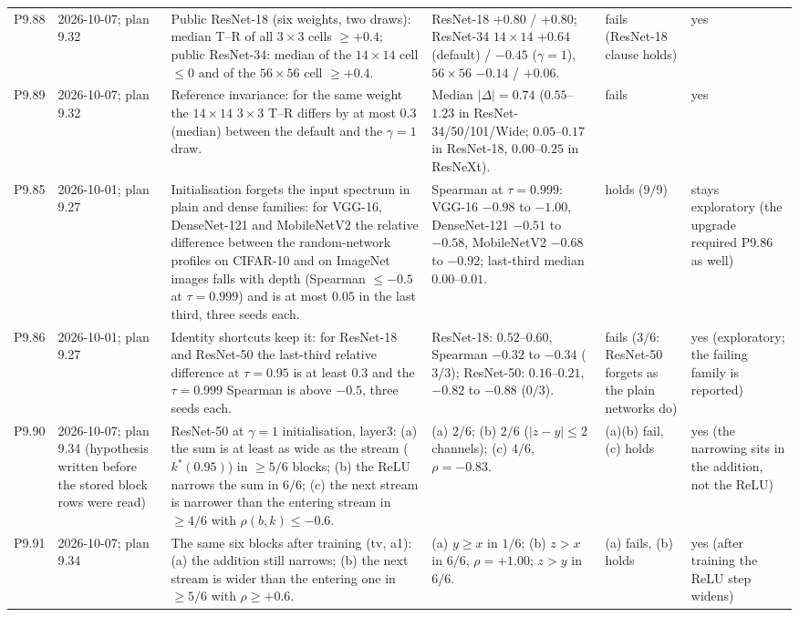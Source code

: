 \begin{longtable}{p{1.1cm}p{1.4cm}p{6.2cm}p{4.6cm}p{2.0cm}p{1.6cm}}
P9.88 & 2026-10-07; plan 9.32 & Public ResNet-18 (six weights, two draws): median T--R of all $3\times3$ cells $\ge +0.4$; public ResNet-34: median of the $14\times14$ cell $\le 0$ and of the $56\times56$ cell $\ge +0.4$. & ResNet-18 $+0.80$ / $+0.80$; ResNet-34 $14\times14$ $+0.64$ (default) / $-0.45$ ($\gamma = 1$), $56\times56$ $-0.14$ / $+0.06$. & fails (ResNet-18 clause holds) & yes \\
P9.89 & 2026-10-07; plan 9.32 & Reference invariance: for the same weight the $14\times14$ $3\times3$ T--R differs by at most $0.3$ (median) between the default and the $\gamma = 1$ draw. & Median $|\Delta| = 0.74$ ($0.55$--$1.23$ in ResNet-34/50/101/Wide; $0.05$--$0.17$ in ResNet-18, $0.00$--$0.25$ in ResNeXt). & fails & yes \\
P9.85 & 2026-10-01; plan 9.27 & Initialisation forgets the input spectrum in plain and dense families: for VGG-16, DenseNet-121 and MobileNetV2 the relative difference between the random-network profiles on CIFAR-10 and on ImageNet images falls with depth (Spearman $\le -0.5$ at $\tau = 0.999$) and is at most $0.05$ in the last third, three seeds each. & Spearman at $\tau = 0.999$: VGG-16 $-0.98$ to $-1.00$, DenseNet-121 $-0.51$ to $-0.58$, MobileNetV2 $-0.68$ to $-0.92$; last-third median $0.00$--$0.01$. & holds ($9/9$) & stays exploratory (the upgrade required P9.86 as well) \\
P9.86 & 2026-10-01; plan 9.27 & Identity shortcuts keep it: for ResNet-18 and ResNet-50 the last-third relative difference at $\tau = 0.95$ is at least $0.3$ and the $\tau = 0.999$ Spearman is above $-0.5$, three seeds each. & ResNet-18: $0.52$--$0.60$, Spearman $-0.32$ to $-0.34$ ($3/3$); ResNet-50: $0.16$--$0.21$, $-0.82$ to $-0.88$ ($0/3$). & fails ($3/6$: ResNet-50 forgets as the plain networks do) & yes (exploratory; the failing family is reported) \\
P9.90 & 2026-10-07; plan 9.34 (hypothesis written before the stored block rows were read) & ResNet-50 at $\gamma = 1$ initialisation, layer3: (a) the sum is at least as wide as the stream ($k^*(0.95)$) in $\ge 5/6$ blocks; (b) the ReLU narrows the sum in $6/6$; (c) the next stream is narrower than the entering stream in $\ge 4/6$ with $\rho(b, k) \le -0.6$. & (a) $2/6$; (b) $2/6$ ($|z - y| \le 2$ channels); (c) $4/6$, $\rho = -0.83$. & (a)(b) fail, (c) holds & yes (the narrowing sits in the addition, not the ReLU) \\
P9.91 & 2026-10-07; plan 9.34 & The same six blocks after training (tv, a1): (a) the addition still narrows; (b) the next stream is wider than the entering one in $\ge 5/6$ with $\rho \ge +0.6$. & (a) $y \ge x$ in $1/6$; (b) $z > x$ in $6/6$, $\rho = +1.00$; $z > y$ in $6/6$. & (a) fails, (b) holds & yes (after training the ReLU step widens) \\

\end{longtable}
